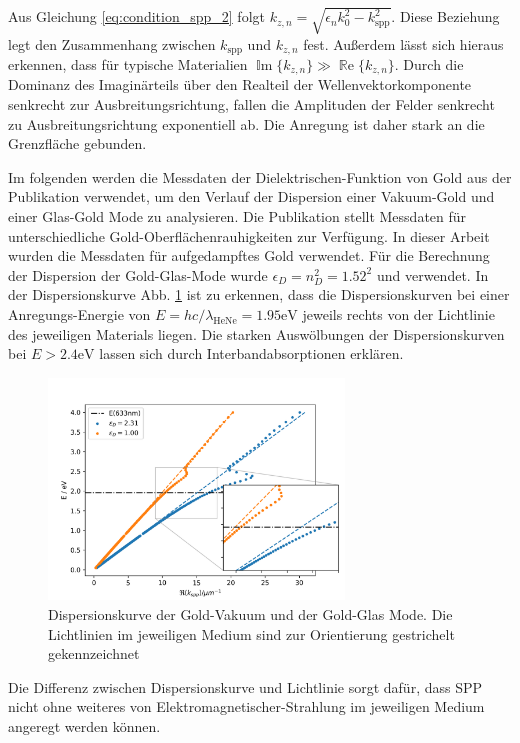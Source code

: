 \documentclass[titlepage]{article}
\renewcommand{\Re}{\operatorname{\mathbb{R}e}}
\begin{document}
		 Aus Gleichung \eqref{eq:condition_spp_2} folgt $k_{z, n} = \sqrt{\epsilon_n k_0^2 - k_{\mathrm{spp}}^2}$. Diese Beziehung legt den Zusammenhang zwischen $k_{\mathrm{spp}}$ und $k_{z, n}$ fest. Außerdem lässt sich hieraus erkennen, dass für typische Materialien $ \operatorname{\mathbb{I}m}\{k_{z, n}\} \gg \Re\{k_{z, n}\}$. Durch die Dominanz des Imaginärteils über den Realteil der Wellenvektorkomponente senkrecht zur Ausbreitungsrichtung, fallen die Amplituden der Felder senkrecht zu Ausbreitungsrichtung exponentiell ab. Die Anregung ist daher stark an die Grenzfläche gebunden. 
	
	Im folgenden werden die Messdaten der Dielektrischen-Funktion von Gold aus der Publikation \cite{Olmon.2012} verwendet, um den Verlauf der Dispersion einer Vakuum-Gold und einer Glas-Gold Mode zu analysieren.  Die Publikation stellt Messdaten für unterschiedliche Gold-Oberflächenrauhigkeiten zur Verfügung. In dieser Arbeit wurden die Messdaten für aufgedampftes Gold verwendet. Für die Berechnung der Dispersion der Gold-Glas-Mode wurde $\epsilon_D = n_D^2 = 1.52^2$ und  verwendet. In der Dispersionskurve Abb. \ref{fig:dispersion_spp} ist zu erkennen, dass die Dispersionskurven bei einer Anregungs-Energie von $E = hc/\lambda_{\mathrm{HeNe}}= 1.95\mathrm{eV}$ jeweils rechts von der Lichtlinie des jeweiligen Materials liegen. Die starken Auswölbungen der Dispersionskurven bei $E > 2.4 \mathrm{eV}$ lassen sich durch Interbandabsorptionen erklären.
	\begin{figure}[h]
		\label{fig:dispersion_spp}
		\centering
		\includegraphics[width=0.7\textwidth]{figures/dispersion.png}
		\caption{Dispersionskurve der Gold-Vakuum und der Gold-Glas Mode. Die Lichtlinien im jeweiligen Medium sind zur Orientierung gestrichelt gekennzeichnet}		
	\end{figure}
	Die Differenz zwischen Dispersionskurve und Lichtlinie sorgt dafür, dass SPP nicht ohne weiteres von Elektromagnetischer-Strahlung im jeweiligen Medium angeregt werden können.	
\end{document}

